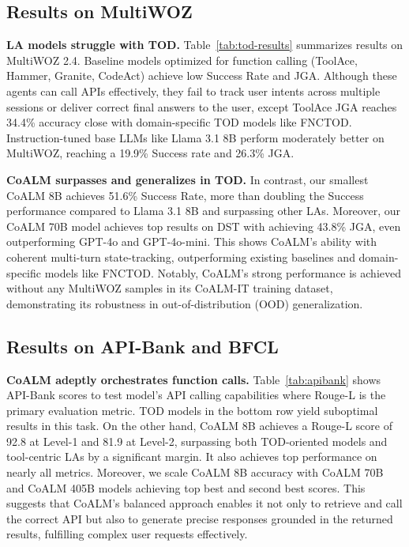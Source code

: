 







\subsection{Results on MultiWOZ}
\vspace{3mm}

\noindent\textbf{LA models struggle with TOD.} Table~\ref{tab:tod-results} summarizes results on MultiWOZ 2.4. Baseline models optimized for function calling (ToolAce, Hammer, Granite, CodeAct) achieve low Success Rate and JGA. Although these agents can call APIs effectively, they fail to track user intents across multiple sessions or deliver correct final answers to the user, except ToolAce JGA reaches 34.4\% accuracy close with domain-specific TOD models like FNCTOD.  Instruction-tuned base LLMs like Llama 3.1 8B perform moderately better on MultiWOZ, reaching a 19.9\% Success rate and 26.3\% JGA. 

\vspace{3mm}

\noindent\textbf{CoALM surpasses and generalizes in TOD.} In contrast, our smallest CoALM 8B achieves 51.6\% Success Rate, more than doubling the Success performance compared to Llama 3.1 8B and surpassing other LAs. Moreover, our CoALM 70B model achieves top results on DST with achieving 43.8\% JGA, even outperforming GPT-4o and GPT-4o-mini. This shows CoALM’s ability with coherent multi-turn state-tracking, outperforming existing baselines and domain-specific models like FNCTOD.  Notably, CoALM's strong performance is achieved without any MultiWOZ samples in its CoALM-IT training dataset, demonstrating its robustness in out-of-distribution (OOD) generalization.

\subsection{Results on API-Bank and BFCL}

\noindent\textbf{CoALM adeptly orchestrates function calls.} Table~\ref{tab:apibank} shows API-Bank scores to test model's API calling capabilities where Rouge-L is the primary evaluation metric. TOD models in the bottom row yield suboptimal results in this task. On the other hand, CoALM 8B achieves a Rouge-L score of 92.8 at Level-1 and 81.9 at Level-2, surpassing both TOD-oriented models and tool-centric LAs by a significant margin. It also achieves top performance on nearly all metrics. Moreover, we scale CoALM 8B accuracy with CoALM 70B and CoALM 405B models achieving top best and second best scores. This suggests that CoALM’s balanced approach enables it not only to retrieve and call the correct API but also to generate precise responses grounded in the returned results, fulfilling complex user requests effectively. 

